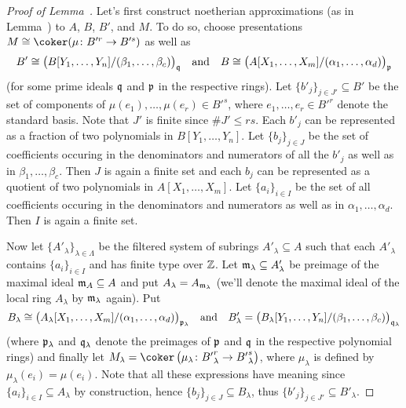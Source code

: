 \documentclass[a4paper,parskip=half,numbers=enddot, DIV=12]{scrreprt}
\renewcommand{\leq}{\leqslant}
\begin{document}
\begin{proof}[Proof of Lemma~]
	Let's first construct noetherian approximations (as in Lemma~) to $A$, $B$, $B'$, and $M$. To do so, choose presentations $M\cong \coker(\mu\colon B'^r\morphism B'^s)$ as well as
	\begin{align*}
	B'\cong \big(B[Y_1,\ldots,Y_n]/(\beta_1,\ldots,\beta_c)\big)_{\mathfrak{q}}\quad\text{and}\quad B\cong \big(A[X_1,\ldots,X_m]/(\alpha_1,\ldots,\alpha_d)\big)_{\mathfrak{p}}
	\end{align*}
	(for some prime ideals $\mathfrak{q}$ and $\mathfrak{p}$ in the respective rings). Let $\{b'_j\}_{j\in J'}\subseteq B'$ be the set of components of $\mu(e_1),\ldots,\mu(e_r)\in B'^s$, where $e_1,\ldots,e_r\in B'^r$ denote the standard basis. Note that $J'$ is finite since $\#J'\leq rs$. Each $b'_j$ can be represented as a fraction of two polynomials in $B[Y_1,\ldots,Y_n]$. Let $\{b_j\}_{j\in J}$ be the set of coefficients occuring in the denominators and numerators of all the $b'_j$ as well as in $\beta_1,\ldots,\beta_c$. Then $J$ is again a finite set and each $b_j$ can be represented as a quotient of two polynomials in $A[X_1,\ldots,X_m]$. Let $\{a_i\}_{i\in I}$ be the set of all coefficients occuring in the denominators and numerators as well as in $\alpha_1,\ldots,\alpha_d$. Then $I$ is again a finite set.
	
	Now let $\{A'_\lambda\}_{\lambda\in \Lambda}$ be the filtered system of subrings $A'_\lambda\subseteq A$ such that each $A'_\lambda$ contains $\{a_i\}_{i\in I}$ and has finite type over $\mathbb{Z}$. Let $\mathfrak{m}_\lambda\subseteq A'_\lambda$ be preimage of the maximal ideal $\mathfrak{m}_A\subseteq A$ and put $A_\lambda=A_{\mathfrak{m}_\lambda}$ (we'll denote the maximal ideal of the local ring $A_\lambda$ by $\mathfrak{m}_\lambda$ again). Put
	\begin{align*}
	B_\lambda\cong \big(A_\lambda[X_1,\ldots,X_m]/(\alpha_1,\ldots,\alpha_d)\big)_{\mathfrak{p}_\lambda}\quad\text{and}\quad B'_\lambda=\big(B_\lambda[Y_1,\ldots,Y_n]/(\beta_1,\ldots,\beta_c)\big)_{\mathfrak{q}_\lambda}
	\end{align*}
	(where $\mathfrak{p}_\lambda$ and $\mathfrak{q}_\lambda$ denote the preimages of $\mathfrak{p}$ and $\mathfrak{q}$ in the respective polynomial rings) and finally let $M_\lambda=\coker\left(\mu_\lambda\colon {B'}_\lambda^r\morphism {B'}_\lambda^s\right)$, where $\mu_\lambda$ is defined by $\mu_\lambda(e_i)=\mu(e_i)$. Note that all these expressions have meaning since $\{a_i\}_{i\in I}\subseteq A_\lambda$ by construction, hence $\{b_j\}_{j\in J}\subseteq B_\lambda$, thus $\{b'_j\}_{j\in J'}\subseteq B'_\lambda$.
	

\end{proof}
\end{document}
